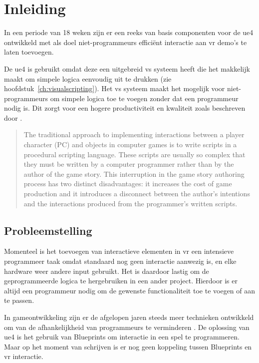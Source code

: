\chapter{Inleiding}

In een periode van 18 weken zijn er een reeks van basis componenten voor de \gls{ue4} ontwikkeld met als doel niet-programmeurs efficiënt interactie aan \gls{vr} demo’s te laten toevoegen.

De \gls{ue4} is gebruikt omdat deze een uitgebreid \gls{vs} systeem heeft die het makkelijk maakt om simpele logica eenvoudig uit te drukken (zie hoofdstuk~\ref{ch:visualscripting}). Het \gls{vs} systeem maakt het mogelijk voor niet-programmeurs om simpele logica toe te voegen zonder dat een programmeur nodig is. Dit zorgt voor een hogere productiviteit en kwaliteit zoals beschreven door \citet{Cutumisu200732}.

\blockquote{
	The traditional approach to implementing interactions between a player character (PC) and objects in computer games is to write scripts in a procedural scripting language. These scripts are usually so complex that they must be written by a computer programmer rather than by the author of the game story. This interruption in the game story authoring process has two distinct disadvantages: it increases the cost of game production and it introduces a disconnect between the author’s intentions and the interactions produced from the programmer’s written scripts.
}

\section{Probleemstelling}

Momenteel is het toevoegen van interactieve elementen in \gls{vr} een intensieve programmeer taak omdat standaard nog geen interactie aanwezig is, en elke hardware weer andere input gebruikt. Het is daardoor lastig om de geprogrammeerde logica te hergebruiken in een ander project. Hierdoor is er altijd een programmeur nodig om de gewenste functionaliteit toe te voegen of aan te passen. 

In gameontwikkeling zijn er de afgelopen jaren steeds meer technieken ontwikkeld om van de afhankelijkheid van programmeurs te verminderen \cite{Cutumisu200732, ambientbehav}. De oplossing van \gls{ue4} is het gebruik van Blueprints om interactie in een spel te programmeren. Maar op het moment van schrijven is er nog geen koppeling tussen Blueprints en \gls{vr} interactie.

